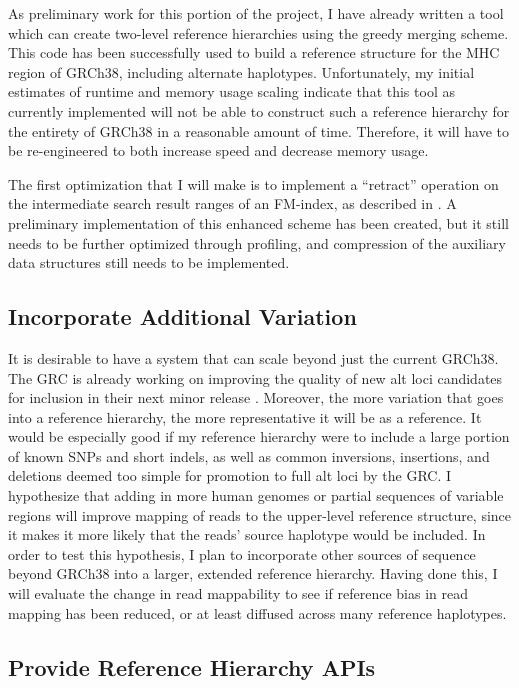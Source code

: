 \documentclass[11pt,proposal]{ucthesis}
\begin{document}
As preliminary work for this portion of the project, I have already written a tool which can create two-level reference hierarchies using the greedy merging scheme. This code has been successfully used to build a reference structure for the MHC region of GRCh38, including alternate haplotypes. Unfortunately, my initial estimates of runtime and memory usage scaling indicate that this tool as currently implemented will not be able to construct such a reference hierarchy for the entirety of GRCh38 in a reasonable amount of time. Therefore, it will have to be re-engineered to both increase speed and decrease memory usage.

The first optimization that I will make is to implement a ``retract'' operation on the intermediate search result ranges of an FM-index, as described in \cite{fischer2008other}. A preliminary implementation of this enhanced scheme has been created, but it still needs to be further optimized through profiling, and compression of the auxiliary data structures still needs to be implemented.

\subsection{Incorporate Additional Variation}
\label{subsec:aim2variation}

It is desirable to have a system that can scale beyond just the current GRCh38. The GRC is already working on improving the quality of new alt loci candidates for inclusion in their next minor release \cite{church2014story}. Moreover, the more variation that goes into a reference hierarchy, the more representative it will be as a reference. It would be especially good if my reference hierarchy were to include a large portion of known SNPs and short indels, as well as common inversions, insertions, and deletions deemed too simple for promotion to full alt loci by the GRC. I hypothesize that adding in more human genomes or partial sequences of variable regions will improve mapping of reads to the upper-level reference structure, since it makes it more likely that the reads' source haplotype would be included. In order to test this hypothesis, I plan to incorporate other sources of sequence beyond GRCh38 into a larger, extended reference hierarchy. Having done this, I will evaluate the change in read mappability to see if reference bias in read mapping has been reduced, or at least diffused across many reference haplotypes.

\subsection{Provide Reference Hierarchy APIs}
\label{subsec:aim2api}
\end{document}
